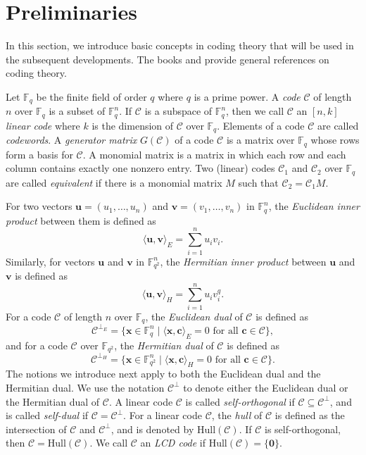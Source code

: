 \documentclass{article}
\theoremstyle{definition}
\theoremstyle{remark}
\begin{document}
\section{Preliminaries}

In this section, we introduce basic concepts in coding theory that will be used in the subsequent developments. The books \cite{Huffman-Coding2} and \cite{Macwilliams-Coding1} provide general references on coding theory.

Let $\mathbb{F}_q$ be the finite field of order $q$ where $q$ is a prime power. A \textit{code} $\mathcal{C}$ of length $n$ over $\mathbb{F}_q$ is a subset of $\mathbb{F}_q^n$. If $\mathcal{C}$ is a subspace of $\mathbb{F}_q^n$, then we call $\mathcal{C}$ an $[n, k]$ \textit{linear code} where $k$ is the dimension of $\mathcal{C}$ over $\mathbb{F}_q$. Elements of a code $\mathcal{C}$ are called \textit{codewords}. A \textit{generator matrix} $G(\mathcal{C})$ of a code $\mathcal{C}$ is a matrix over $\mathbb{F}_q$ whose rows form a basis for $\mathcal{C}$. A monomial matrix is a matrix in which each row and each column contains exactly one nonzero entry. Two (linear) codes $\mathcal{C}_1$ and $\mathcal{C}_2$ over $\mathbb{F}_q$ are called \textit{equivalent} if there is a monomial matrix $M$ such that $\mathcal{C}_2=\mathcal{C}_1M$.

For two vectors $\mathbf{u}=(u_1, \ldots, u_n)$ and $\mathbf{v}=(v_1, \ldots, v_n)$ in $\mathbb{F}_q^n$, the \textit{Euclidean inner product} between them is defined as
\[
\langle \mathbf{u}, \mathbf{v}\rangle_E=\sum_{i=1}^nu_iv_i.
\]
Similarly, for vectors $\mathbf{u}$ and $\mathbf{v}$ in $\mathbb{F}_{q^2}^n$, the \textit{Hermitian inner product} between $\mathbf{u}$ and $\mathbf{v}$ is defined as
\[
\langle \mathbf{u}, \mathbf{v}\rangle_H=\sum_{i=1}^nu_iv_i^q.
\]
For a code $\mathcal{C}$ of length $n$ over $\mathbb{F}_q$, the \textit{Euclidean dual} of $\mathcal{C}$ is defined as
\[
\mathcal{C}^{\perp_E}=\{\mathbf{x}\in\mathbb{F}_q^n\mid\langle\mathbf{x}, \mathbf{c}\rangle_E=0\text{ for all }\mathbf{c}\in\mathcal{C}\},
\]
and for a code $\mathcal{C}$ over $\mathbb{F}_{q^2}$, the \textit{Hermitian dual} of $\mathcal{C}$ is defined as
\[
\mathcal{C}^{\perp_H}=\{\mathbf{x}\in\mathbb{F}_{q^2}^n\mid\langle\mathbf{x}, \mathbf{c}\rangle_H=0\text{ for all }\mathbf{c}\in\mathcal{C}\}.
\]
The notions we introduce next apply to both the Euclidean dual and the Hermitian dual. We use the notation $\mathcal{C}^\perp$ to denote either the Euclidean dual or the Hermitian dual of $\mathcal{C}$. A linear code $\mathcal{C}$ is called \textit{self-orthogonal} if $\mathcal{C}\subseteq \mathcal{C}^{\perp}$, and is called \textit{self-dual} if $\mathcal{C}=\mathcal{C}^\perp$. For a linear code $\mathcal{C}$, the \textit{hull} of $\mathcal{C}$ is defined as the intersection of $\mathcal{C}$ and $\mathcal{C}^\perp$, and is denoted by $\text{Hull}(\mathcal{C})$. If $\mathcal{C}$ is self-orthogonal, then $\mathcal{C}=\text{Hull}(\mathcal{C})$. We call $\mathcal{C}$ an \textit{LCD code} if $\text{Hull}(\mathcal{C})=\{\mathbf{0}\}$.
\end{document}
